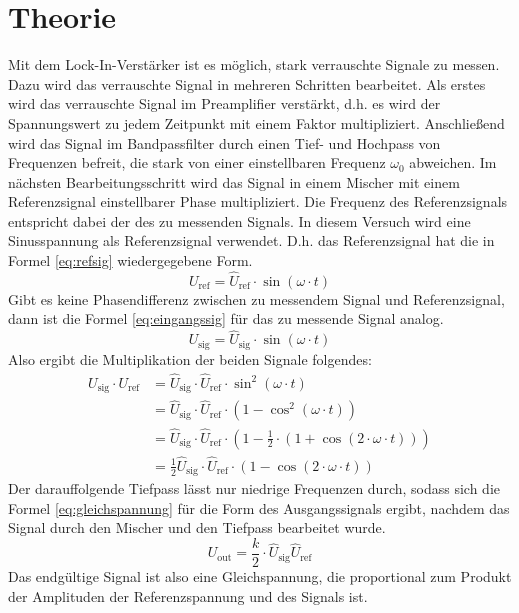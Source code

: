 
\section{Theorie}
Mit dem Lock-In-Verstärker ist es möglich, stark verrauschte Signale zu
messen.  Dazu wird das verrauschte Signal in mehreren Schritten
bearbeitet. Als erstes wird das verrauschte Signal im Preamplifier
verstärkt, d.h. es wird der Spannungswert zu jedem Zeitpunkt mit einem
Faktor multipliziert. Anschließend wird das Signal im Bandpassfilter
durch einen Tief- und Hochpass von Frequenzen befreit, die stark von
einer einstellbaren Frequenz $\omega_0$ abweichen.  Im nächsten
Bearbeitungsschritt wird das Signal in einem Mischer mit einem
Referenzsignal einstellbarer Phase multipliziert. Die Frequenz des
Referenzsignals entspricht dabei der des zu messenden Signals.  In
diesem Versuch wird eine Sinusspannung als Referenzsignal
verwendet. D.h. das Referenzsignal hat die in Formel \eqref{eq:refsig}
wiedergegebene Form.
%
\begin{equation}
  \label{eq:refsig}
  U_\text{ref} = \widehat{U}_\text{ref} \cdot \sin(\omega \cdot t)
\end{equation}
%
Gibt es keine Phasendifferenz zwischen zu messendem Signal und
Referenzsignal, dann ist die Formel \eqref{eq:eingangssig} für das zu
messende Signal analog.
%
\begin{equation}
  \label{eq:eingangssig}
  U_\text{sig} = \widehat{U}_\text{sig} \cdot \sin(\omega \cdot t)
\end{equation}
%
Also ergibt die Multiplikation der beiden Signale folgendes:
%
\begin{equation*}
  \begin{split}
    U_\text{sig} \cdot U_\text{ref}
    &= \widehat{U}_\text{sig}\cdot \widehat{U}_\text{ref}\cdot
    \sin^2(\omega \cdot t) \\
    &= \widehat{U}_\text{sig} \cdot \widehat{U}_\text{ref}
    \cdot (1 - \cos^2(\omega \cdot t)) \\
    &= \widehat{U}_\text{sig} \cdot \widehat{U}_\text{ref} \cdot (1 -
    \frac{1}{2} \cdot (1 +
    \cos(2\cdot \omega \cdot t)))\\
    &= \frac{1}{2} \widehat{U}_\text{sig} \cdot \widehat{U}_\text{ref}
    \cdot(1 - \cos(2\cdot \omega\cdot t))
  \end{split}
\end{equation*}
%
Der darauffolgende Tiefpass lässt nur niedrige Frequenzen durch, sodass
sich die Formel \eqref{eq:gleichspannung} für die Form des
Ausgangssignals ergibt, nachdem das Signal durch den Mischer und den
Tiefpass bearbeitet wurde.
%
\begin{equation}
  \label{eq:gleichspannung}
  U_\text{out} = \frac{k}{2} \cdot \widehat{U}_\text{sig} \widehat{U}_\text{ref}
\end{equation}
%
Das endgültige Signal ist also eine Gleichspannung, die proportional zum
Produkt der Amplituden der Referenzspannung und des Signals ist.

